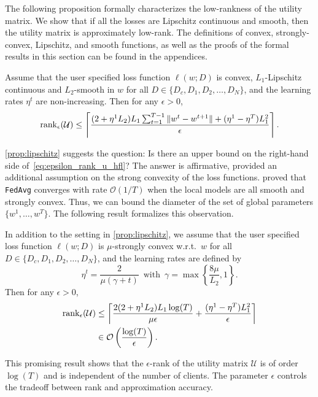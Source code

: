 The following proposition formally characterizes the low-rankness of the utility matrix. We show that if all the losses are Lipschitz continuous and smooth, then the utility matrix is approximately low-rank. The definitions of convex, strongly-convex, Lipschitz, and smooth functions, as well as the proofs of the formal results in this section can be found in the appendices.

\begin{proposition} \label{prop:lipschitz}
    Assume that the user specified loss function $\ell(w; D)$ is convex, $L_1$-Lipschitz continuous and $L_2$-smooth in $w$ for all $D \in \{D_c, D_1, D_2, \dots, D_N\}$, and the learning rates $\eta^t$ are non-increasing. 
    Then for any $\epsilon>0$, 
    \begin{equation} \label{eq:epsilon_rank_u_hfl}
        \operatorname{rank}_{\epsilon}(\mathcal{U}) \leq \left\lceil \frac{(2+\eta^1L_2) L_1 \sum_{t=1}^{T-1} \|w^{t} - w^{t+1}\| + (\eta^1 - \eta^T) L_1^2}{\epsilon} \right\rceil.
    \end{equation} 
\end{proposition}

\autoref{prop:lipschitz} suggests the question: Is there an upper bound on the right-hand side of~\eqref{eq:epsilon_rank_u_hfl}? The answer is affirmative, provided an additional assumption on the strong convexity of the loss functions. \citet{li2019convergence} proved that \texttt{FedAvg} converges with rate $\mathcal{O}(1 / T)$ when the local models are all smooth and strongly convex. Thus, we can bound the diameter of the set of global parameters $\{w^1, \dots, w^T\}$. The following result formalizes this observation. 

\begin{proposition} \label{prop:strongly_cvx}
    In addition to the setting in \autoref{prop:lipschitz}, we assume that the user specified loss function $\ell(w; D)$ is $\mu$-strongly convex w.r.t.\ $w$ for all $D \in \{D_c, D_1, D_2, \dots, D_N\}$, and the learning rates are defined by 
    \[\eta^t = \frac{2}{\mu(\gamma + t)} \enspace\text{with}\enspace \gamma = \max\left\{\frac{8\mu}{L_2}, 1\right\}.\]
    Then for any $\epsilon>0$, 
    \begin{align*}
        \operatorname{rank}_{\epsilon}(\mathcal{U}) &\leq \left\lceil \frac{2(2+\eta^1L_2) L_1 \log(T)}{\mu\epsilon} +  \frac{(\eta^1 - \eta^T)L_1^2}{\epsilon} \right\rceil
        \\&\in \mathcal{O}\left(\frac{\log(T)}{\epsilon}\right).
    \end{align*}
\end{proposition}
This promising result shows that the $\epsilon$-rank of the utility matrix $\mathcal{U}$ is of order $\log(T)$ and is independent of the number of clients. The parameter $\epsilon$ controls the tradeoff between rank and approximation accuracy.

